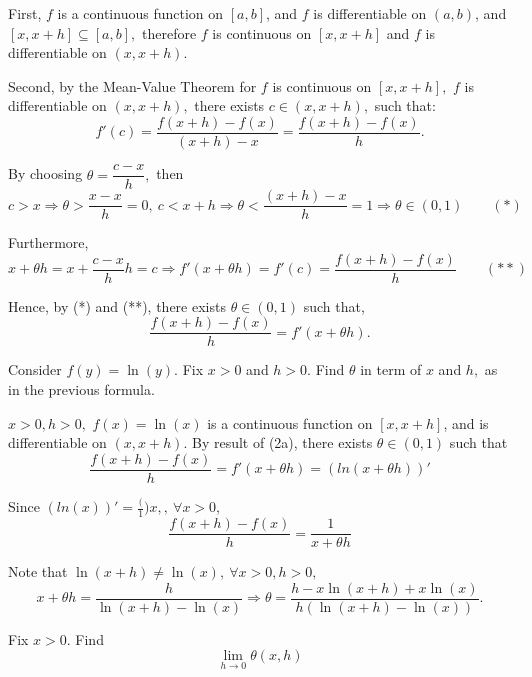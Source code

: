 \documentclass{article}
\begin{document}
\begin{soln}
    First, $f$ is a continuous function on $[a,b]$, and $f$ is differentiable on $(a,b)$, and $[x, x+h] \subseteq [a,b],$
    therefore $f$ is continuous on $[x, x+h]$ and $f$ is differentiable on $(x, x+h).$ 

    Second, by the Mean-Value Theorem for $f$ is continuous on $[x, x+h],$ $f$ is differentiable on $(x, x+h),$ there exists $c \in (x, x+h),$ such that:
    \[
        f'(c) = \frac{f(x+h)-f(x)}{(x+h) - x} = \frac{f(x+h) - f(x)}{h}.
    \]

    By choosing $\theta = \dfrac{c-x}{h},$ then
    \[
        c > x \Rightarrow \theta > \frac{x-x}{h} = 0,\ c < x+h \Rightarrow \theta < \frac{(x+h)-x}{h} = 1 \Rightarrow \theta \in (0, 1) \qquad(*)
    \]

    Furthermore,
    \[
        x + \theta h = x + \dfrac{c-x}{h} h  = c \Rightarrow f'(x+ \theta h) = f'(c) = \frac{f(x+h) - f(x)}{h} \qquad (**)
    \]

    Hence, by (*) and (**), there exists $\theta \in (0,1)$ such that, 
    \[
        \frac{f(x+h) - f(x)}{h} = f'(x + \theta h).
    \]
\end{soln}

\newpage

\begin{problem*}[2b]
    Consider $f(y) = \ln(y).$ Fix $x >0$ and $h>0.$ Find $\theta$ in term of $x$ and $h,$ as in the previous formula.
\end{problem*}

\begin{soln}
    $x > 0, h > 0,$ $f(x)=\ln(x)$ is a continuous function on $[x,x+h]$, and is differentiable on $(x, x+h).$
    By result of (2a), there exists $\theta \in (0,1)$  such that
    \[
        \frac{f(x+h) - f(x)}{h} = f'(x + \theta h) = (ln(x + \theta h))'
    \]

    Since $(ln(x))' = \frac(1){x},,\ \forall x > 0,$
    \[
        \frac{f(x+h) - f(x)}{h} = \frac{1}{x + \theta h} 
    \]
    
    Note that $\ln(x+h) \ne \ln(x),\ \forall x > 0, h > 0,$
    \[
        x + \theta h = \frac{h}{\ln(x+h) - \ln(x)}
        \Rightarrow \theta = \frac{h - x \ln(x+h) + x \ln(x)}{h(\ln(x+h) - \ln(x))}.
    \]
    
\end{soln}

\newpage

\begin{problem*}[2c]
    Fix $x >0.$ Find
    \[
        \lim_{h \rightarrow 0} \theta(x,h)
    \]
\end{problem*}
\end{document}
